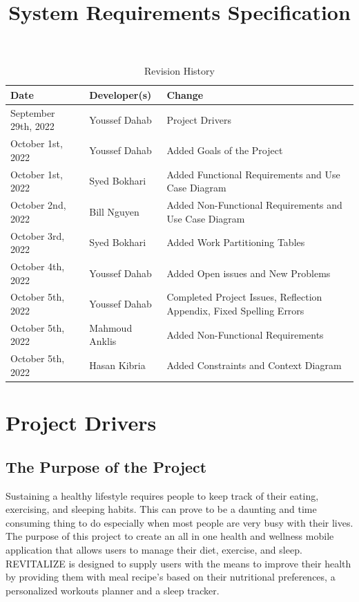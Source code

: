 \documentclass[12pt,letterpaper]{article}
\title{System Requirements Specification\\\progname}
\author{\authname}
\date{}
\begin{document}
\maketitle

\begin{table}[hp]
\caption{Revision History} \label{TblRevisionHistory}
\begin{tabularx}{\textwidth}{llX}
	\toprule
	\textbf{Date} & \textbf{Developer(s)} & \textbf{Change}\\
	\midrule
	September 29th, 2022 & Youssef Dahab & Project Drivers \\
	October 1st, 2022 & Youssef Dahab & Added Goals of the Project \\
	October 1st, 2022 & Syed Bokhari & Added Functional Requirements and Use Case Diagram \\
	October 2nd, 2022 & Bill Nguyen & Added Non-Functional Requirements and Use Case Diagram \\
	October 3rd, 2022 & Syed Bokhari & Added Work Partitioning Tables \\
	October 4th, 2022 & Youssef Dahab & Added Open issues and New Problems \\
	October 5th, 2022 & Youssef Dahab & Completed Project Issues, Reflection Appendix, Fixed Spelling Errors\\
	October 5th, 2022 & Mahmoud Anklis & Added Non-Functional Requirements\\
	October 5th, 2022 & Hasan Kibria & Added Constraints and Context Diagram \\
	\bottomrule
\end{tabularx}
\end{table}

\newpage
\tableofcontents
\newpage

\section{Project Drivers}

\subsection{The Purpose of the Project}
Sustaining a healthy lifestyle requires people to keep track of their eating, exercising, and sleeping habits. This can prove to be a daunting and time consuming thing to do especially when most people are very busy with their lives. The purpose of this project to create an all in one health and wellness mobile application that allows users to manage their diet, exercise, and sleep. REVITALIZE is designed to supply users with the means to improve their health by providing them with meal recipe's based on their nutritional preferences, a personalized workouts planner and a sleep tracker. 
\end{document}

